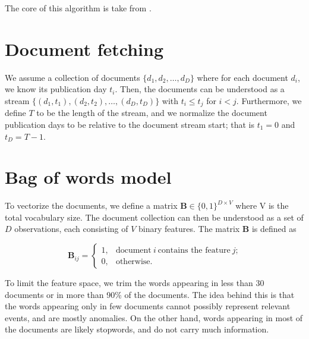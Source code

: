 

The core of this algorithm is take from \cite{event-detection}.

\section{Document fetching}
We assume a collection of documents $\{d_{1}, d_{2}, \dots, d_{D}\}$ where for each document $d_{i}$, we know its publication day $t_{i}$. Then, the documents can be understood as a stream $\{(d_{1}, t_{1}), (d_{2}, t_{2}), \dots, (d_{D}, t_{D})\}$ with $t_{i} \leq t_{j}$ for $i < j$. Furthermore, we define $T$ to be the length of the stream, and we normalize the document publication days to be relative to the document stream start; that is $t_{1} = 0$ and $t_{D} = T - 1$.


\section{Bag of words model}
To vectorize the documents, we define a matrix $\mathbf{B} \in \{0, 1\}^{D \times V}$ where V is the total vocabulary size. The document collection can then be understood as a set of $D$ observations, each consisting of $V$ binary features. The matrix $\mathbf{B}$ is defined as

\begin{equation}
	\mathbf{B}_{ij} = \begin{cases}
		1, & \text{document}~i~\text{contains the feature}~j \text{;} \\
		0, & \text{otherwise.}
	\end{cases}
\end{equation}

To limit the feature space, we trim the words appearing in less than 30 documents or in more than 90\% of the documents. The idea behind this is that the words appearing only in few documents cannot possibly represent relevant events, and are mostly anomalies. On the other hand, words appearing in most of the documents are likely stopwords, and do not carry much information.

